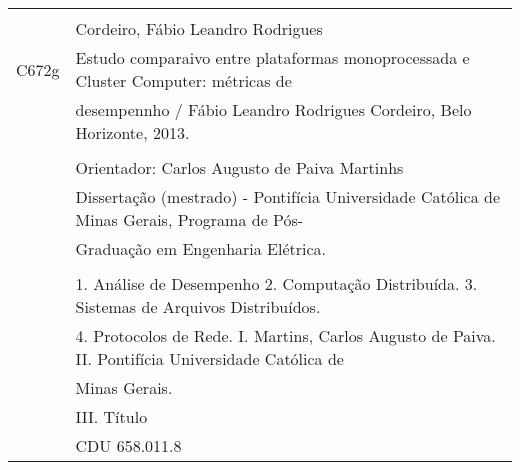 \begin{newpage}
	\thispagestyle{empty}	

	
  \newpage \normalsize
  \thispagestyle{empty}
  $ \   $
  \vspace{13cm}
  \begin{footnotesize}
  \begin{center}
  \begin{tabular}{|cl|} \hline
   \hspace{1cm} & \\
        & Cordeiro, Fábio Leandro Rodrigues\\
     C672g & \hspace{0.6cm} Estudo comparaivo entre plataformas monoprocessada e Cluster Computer: métricas de \\ 
        & desempennho / Fábio Leandro Rodrigues Cordeiro, Belo Horizonte, 2013. \\
        &  \\
        & \hspace{0.6cm} Orientador: Carlos Augusto de Paiva Martinhs\\
        & \hspace{0.6cm} Dissertação (mestrado) - Pontifícia Universidade Católica de Minas Gerais, Programa de Pós-\\
        & Graduação em Engenharia Elétrica. \\
        & \\
        & \hspace{0.6cm} 1. Análise de Desempenho 2. Computação Distribuída. 3. Sistemas de Arquivos Distribuídos.\\
        & 4. Protocolos de Rede. I. Martins, Carlos Augusto  de Paiva. II. Pontifícia Universidade Católica de\\
        &  Minas Gerais. \\
        &   III. Título \\
        &  \hspace{12cm} CDU 658.011.8 \\ \hline
  \end{tabular}
  \end{center}
  \end{footnotesize}%
  \hspace*{-1cm}
	
	
	
	

\end{newpage}